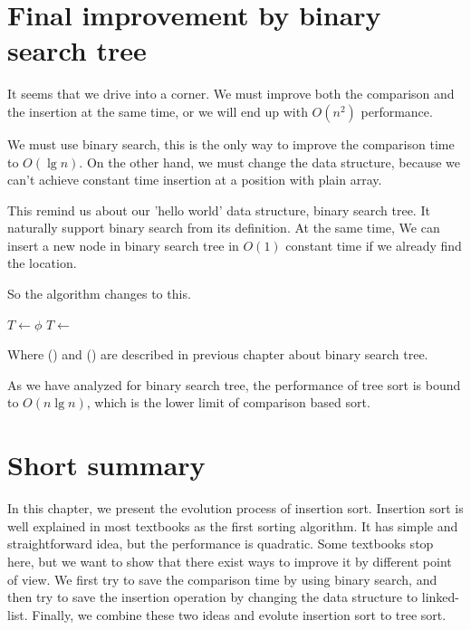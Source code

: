 \documentclass{article}
\begin{document}

\section{Final improvement by binary search tree}

It seems that we drive into a corner. We must improve both the comparison
and the insertion at the same time, or we will end up with $O(n^2)$ performance.

We must use binary search, this is the only way to improve the comparison
time to $O(\lg n)$. On the other hand, we must change the data structure,
because we can't achieve constant time insertion at a position with
plain array.

This remind us about our 'hello world' data structure, binary search tree.
It naturally support binary search from its definition. At the same time,
We can insert a new node in binary search tree in $O(1)$ constant time
if we already find the location.

So the algorithm changes to this.

\begin{algorithmic}
  \State $T \gets \phi$
    \State $T \gets $ 
  \EndFor
  \State \Return {}
\EndFunction
\end{algorithmic}

Where () and () are described in
previous chapter about binary search tree.

As we have analyzed for binary search tree, the performance of tree sort
is bound to $O(n \lg n)$, which is the lower limit of comparison based
sort\cite{Knuth}.

\section{Short summary}
In this chapter, we present the evolution process of insertion sort. Insertion
sort is well explained in most textbooks as the first sorting algorithm.
It has simple and straightforward idea, but the performance is quadratic.
Some textbooks stop here, but we want to show that there exist ways to improve
it by different point of view. We first try to save the comparison time
by using binary search, and then try to save the insertion operation by
changing the data structure to linked-list. Finally, we combine these
two ideas and evolute insertion sort to tree sort.
\end{document}

